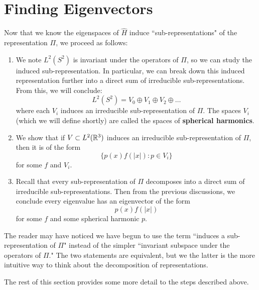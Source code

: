 \section{Finding Eigenvectors}
Now that we know the eigenspaces of $\hat{H}$ induce ``sub-representations" of the representation $\Pi$, we proceed as follows:
\begin{enumerate}
    \item We note $L^2(S^2)$ is invariant under the operators of $\Pi$, so we can study the induced sub-representation. In particular, we can break down this induced representation further into a direct sum of irreducible sub-representations. From this, we will conclude:
        \[
            L^2(S^2) = V_0 \oplus V_1 \oplus V_2 \oplus \dots
        \]
        where each $V_i$ induces an irreducible sub-representation of $\Pi$. The spaces $V_i$ (which we will define shortly) are called the spaces of \textbf{spherical harmonics}.

    \item We show that if $V \subset L^2({\mathbb R}^3)$ induces an irreducible sub-representation of $\Pi$, then it is of the form
        \[
            \{p(x)f(|x|): p \in V_i\}
        \]
        for some $f$ and $V_i$.

    \item Recall that every sub-representation of $\Pi$ decomposes into a direct sum of irreducible sub-representations. Then from the previous discussions, we conclude every eigenvalue has an eigenvector of the form
        \[
            p(x)f(|x|)
        \]
        for some $f$ and some spherical harmonic $p$.
\end{enumerate}
The reader may have noticed we have begun to use the term ``induces a sub-representation of $\Pi$" instead of the simpler ``invariant subspace under the operators of $\Pi$." The two statements are equivalent, but we the latter is the more intuitive way to think about the decomposition of representations.

The rest of this section provides some more detail to the steps described above.
